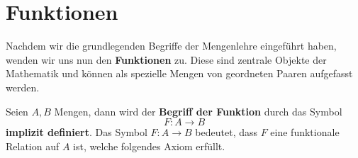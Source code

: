 \documentclass[main.tex]{subfiles}
\begin{document}

\begin{tabproof}
\end{tabproof}

\begin{tabproof}
\end{tabproof}

\chapter{Funktionen}
Nachdem wir die grundlegenden Begriffe der Mengenlehre eingeführt haben, wenden wir uns nun den 
\textbf{Funktionen} zu. Diese sind zentrale Objekte der Mathematik und können als spezielle Mengen 
von geordneten Paaren aufgefasst werden.

\begin{definition}
Seien \(A,B\) Mengen, dann wird der \textbf{Begriff der Funktion} durch das Symbol
\[
F\colon A \to B
\]
\textbf{implizit definiert}. 
Das Symbol \(F\colon A\to B\) bedeutet, dass \(F\) eine funktionale Relation auf \(A\) ist, welche folgendes Axiom erfüllt.
\end{definition}


\begin{tabproof}
\end{tabproof}
\end{document}
